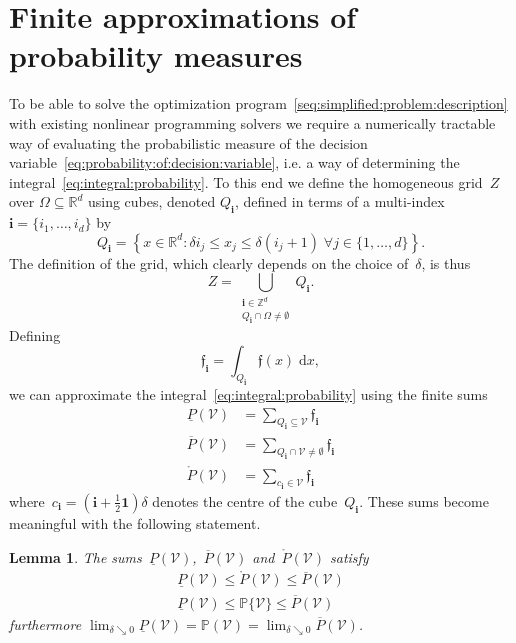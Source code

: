 \documentclass[letterpaper, 10pt, conference]{ieeeconf} %
\newtheorem{thm}{Lemma}[section]
\providecommand{\bfa}[1]{\mathbf{#1}}
\begin{document}
\section{Finite approximations of probability measures}\label{sec:counting:cubes}
%
%
%
%
\noindent To be able to solve the optimization program~\eqref{seq:simplified:problem:description} with existing nonlinear programming solvers we require a numerically tractable way of evaluating the probabilistic measure of the decision variable~\eqref{eq:probability:of:decision:variable}, i.e. a way of determining the integral~\eqref{eq:integral:probability}.
%
To this end we define the homogeneous grid~$Z$ over $\Omega\subseteq\mathbb R^d$ using cubes, denoted $Q_{\bfa{i}}$, defined in terms of a multi-index $\bfa{i}=\{i_1,\ldots,i_d\}$ by
%
\begin{equation}
	Q_{\bfa{i}} =\left\{x\in\mathbb R^d: \delta i_j \leq x_j\leq\delta (i_j+1)\;\forall j\in\{1,\dots,d\} \right\} .
\end{equation}
%
The definition of the grid, which clearly depends on the choice of~$\delta$, is thus
%
\begin{equation}
	Z = \bigcup_{\substack{\bfa{i}\in\mathbb Z^d\\ Q_\bfa{i}\cap\Omega\neq\emptyset}} Q_\bfa{i} .
\end{equation}
%
Defining
%
\begin{equation}
	\mathfrak f_\bfa{i} = \int_{Q_\bfa{i}}\mathfrak f(x)\; \mathrm d x ,
\end{equation}
%
we can approximate the integral~\eqref{eq:integral:probability} using the finite sums
%
\begin{align}
\underline{P}(\mathcal V) &= \sum_{Q_\bfa{i}\subseteq\mathcal V}\mathfrak f_\bfa{i}\label{eq:inner:approx}\\
\overline{P}(\mathcal V) &= \sum_{Q_\bfa{i}\cap\mathcal V\neq\emptyset}\mathfrak f_\bfa{i} \label{eq:outer:approx}\\
\mathring{P}(\mathcal V) &= \sum_{c_\bfa{i}\in\mathcal V}\mathfrak f_\bfa{i}\label{eq:center:approx}
\end{align}
%
where~$c_\bfa{i}=(\bfa{i}+\frac{1}{2}\bfa{1})\delta$ denotes the centre of the cube~$Q_\bfa{i}$.
%
These sums become meaningful with the following statement.
%
\begin{thm}\label{thm:sandwich:inequality}
The sums~$\underline P(\mathcal V)$,~$\overline{P}(\mathcal V)$ and~$\mathring{P}(\mathcal V)$ satisfy
%
\begin{align}
\underline{P}(\mathcal V)\leq \mathring{P}(\mathcal V)\leq\overline{P}(\mathcal V)\label{eq:sandwich:synthetical}\\
\underline{P}(\mathcal V)\leq \mathbb P\{\mathcal V\}\leq\overline{P}(\mathcal V)\label{eq:sandwich:analytical}
\end{align}
%
furthermore $\lim_{\delta\searrow0}\underline{P}(\mathcal V)=\mathbb{P}(\mathcal V)=\lim_{\delta\searrow0}\overline{P}(\mathcal V)$.
\end{thm}
\end{document}
